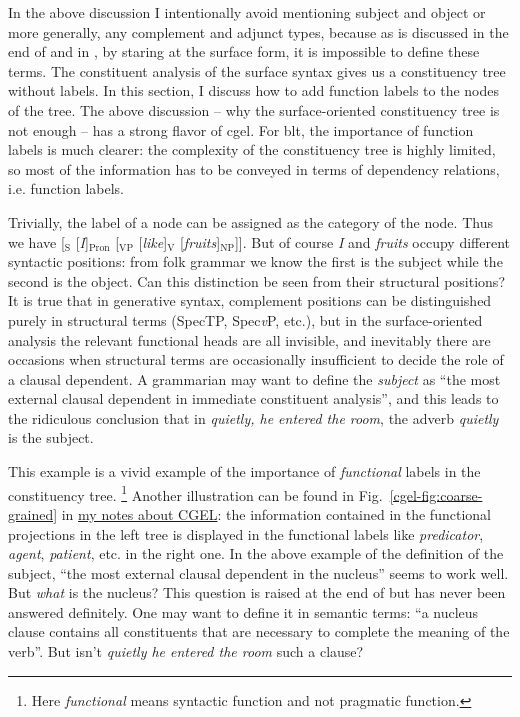 \documentclass[UTF8, a4paper, oneside, scheme=plain]{ctexart}
\newcommand*{\citefig}[1]{Fig.~{#1}}
\newcommand*{\term}[1]{\emph{#1}}
\newcommand*{\corpus}[1]{\emph{#1}}
\newcommand*{\vP}{\textit{v}P}
\newcommand{\cgel}{\href{../English/cambridge.pdf}{my notes about CGEL}}
\begin{document}
In the above discussion I intentionally avoid mentioning subject and object
or more generally, any complement and adjunct types,
because as is discussed in the end of 
and in ,
by staring at the surface form,
it is impossible to define these terms.
The constituent analysis of the surface syntax 
gives us a constituency tree without labels.
In this section, I discuss how to add function labels to the nodes of the tree.
The above discussion -- why the surface-oriented constituency tree is not enough -- 
has a strong flavor of \ac{cgel}.
For \ac{blt}, the importance of function labels is much clearer:
the complexity of the constituency tree is highly limited,
so most of the information has to be conveyed in terms of 
dependency relations, i.e. function labels.

Trivially, the label of a node can be assigned as the category of the node.
Thus we have 
{[$_{\text{S}}$ [\corpus{I}]$_{\text{Pron}}$ [$_{\text{VP}}$ [\corpus{like}]$_{\text{V}}$ [\corpus{fruits}]$_{\text{NP}}$]]}.
But of course \corpus{I} and \corpus{fruits} occupy different syntactic positions:
from folk grammar we know the first is the subject while the second is the object.
Can this distinction be seen from their structural positions?
It is true that in generative syntax,
complement positions can be distinguished purely in structural terms 
(SpecTP, Spec\vP, etc.),
but in the surface-oriented analysis the relevant functional heads are all invisible,
and inevitably there are occasions 
when structural terms are occasionally insufficient to decide the role of a clausal dependent.
A grammarian may want to define the \term{subject} as 
``the most external clausal dependent in immediate constituent analysis'',
and this leads to the ridiculous conclusion that 
in \corpus{quietly, he entered the room}, 
the adverb \corpus{quietly} is the subject.

This example is a vivid example of the importance of \emph{functional} labels in the constituency tree.%
\footnote{
    Here \term{functional} means syntactic function and not pragmatic function.
}
Another illustration can be found in \citefig{\ref{cgel-fig:coarse-grained}} in \cgel:
the information contained in the functional projections in the left tree 
is displayed in the functional labels like \term{predicator}, \term{agent}, \term{patient}, etc.
in the right one.
In the above example of the definition of the subject,
``the most external clausal dependent in the nucleus'' seems to work well.
But \emph{what} is the nucleus?
This question is raised at the end of  
but has never been answered definitely.
One may want to define it in semantic terms:
``a nucleus clause contains all constituents that are necessary to complete the meaning of the verb''.
But isn't \corpus{quietly he entered the room} such a clause?
\end{document}
